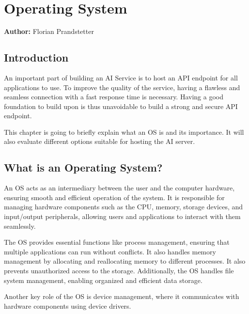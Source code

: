 \chapter{Operating System }
\label{chap:Operating_Systems_used}
\textbf{Author:} Florian Prandstetter

\author{Florian Prandstetter}

\section {Introduction}

An important part of building an AI Service is to host an API endpoint for all applications to use. To improve the quality of the service, having a flawless and seamless connection with a fast response time is necessary.
Having a good foundation to build upon is thus unavoidable to build a strong and secure API endpoint. 

This chapter is going to briefly explain what an OS is and its importance.
It will also evaluate different options suitable for hosting the AI server.

\section{What is an Operating System?}
\label{sec:WhatIsAnOs}

An OS acts as an intermediary between the user and the computer hardware, ensuring smooth and efficient operation of the system. It is responsible for managing hardware components such as the CPU, memory, storage devices, and input/output peripherals, allowing users and applications to interact with them seamlessly.

The OS provides essential functions like process management, ensuring that multiple applications can run without conflicts. It also handles memory management by allocating and reallocating memory to different processes. It also prevents unauthorized access to the storage.
Additionally, the OS handles file system management, enabling organized and efficient data storage. 

Another key role of the OS is device management, where it communicates with hardware components using device drivers.

